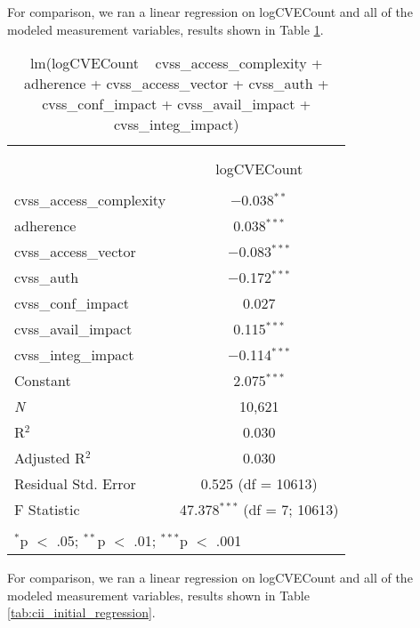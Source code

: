 
For comparison, we ran a linear regression on logCVECount and all of the modeled measurement variables, results shown in Table \ref{tab:nvd_initial_regression}.

\begin{table}[!htbp] \centering 
	\caption{lm(logCVECount ~ cvss\_access\_complexity + adherence + cvss\_access\_vector + cvss\_auth + cvss\_conf\_impact + cvss\_avail\_impact + cvss\_integ\_impact)} 
	\label{tab:nvd_initial_regression} 
	\begin{tabular}{@{\extracolsep{5pt}}lc} 
		\\[-1.8ex]\hline \\[-1.8ex] 
		\\[-1.8ex] & logCVECount \\ 
		\hline \\[-1.8ex] 
		cvss\_access\_complexity & $-$0.038$^{**}$ \\ 
		adherence & 0.038$^{***}$ \\ 
		cvss\_access\_vector & $-$0.083$^{***}$ \\ 
		cvss\_auth & $-$0.172$^{***}$ \\ 
		cvss\_conf\_impact & 0.027 \\ 
		cvss\_avail\_impact & 0.115$^{***}$ \\ 
		cvss\_integ\_impact & $-$0.114$^{***}$ \\ 
		Constant & 2.075$^{***}$ \\ 
		\textit{N} & 10,621 \\ 
		R$^{2}$ & 0.030 \\ 
		Adjusted R$^{2}$ & 0.030 \\ 
		Residual Std. Error & 0.525 (df = 10613) \\ 
		F Statistic & 47.378$^{***}$ (df = 7; 10613) \\ 
		\hline \\[-1.8ex] 
		\multicolumn{2}{l}{$^{*}$p $<$ .05; $^{**}$p $<$ .01; $^{***}$p $<$ .001} \\ 
	\end{tabular} 
\end{table}


For comparison, we ran a linear regression on logCVECount and all of the modeled measurement variables, results shown in Table \ref{tab:cii_initial_regression}.

